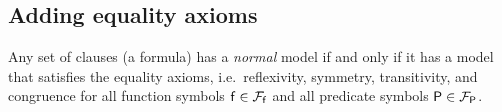 \subsection{Adding equality axioms}\label{sec:equality:axioms}

\begin{theorem}\cite{Harrison:2009:HPL:1540610}
	Any set of clauses (a formula) has a \emph{normal} model
	if and only if it has a model that satisfies the
	{\myem equality axioms}, i.e.~reflexivity, symmetry, transitivity,
	and congruence for all function symbols $\mathsf{f}\in{\mathcal{F}_{\mathsf{f}}}$
	and all predicate symbols $\mathsf{P}\in{\mathcal{F}_{\mathsf{P}}}$.
\end{theorem}


